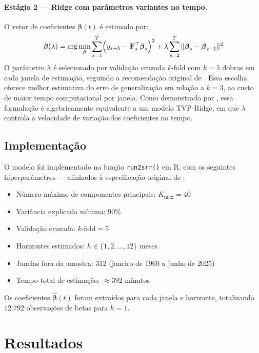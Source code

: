 \documentclass[12pt, a4paper]{article}
\begin{document}
\paragraph{Estágio 2 — Ridge com parâmetros variantes no tempo.}
O vetor de coeficientes $\boldsymbol{\beta}(t)$ é estimado por:
\[
  \hat{\boldsymbol{\beta}}(\lambda) =
  \arg\min_{\boldsymbol{\beta}}
  \sum_{s=1}^{T}
  \Bigl(y_{s+h} - \mathbf{F}_s^\top \boldsymbol{\beta}_s\Bigr)^2
  + \lambda \sum_{s=2}^{T}
  \|\boldsymbol{\beta}_s - \boldsymbol{\beta}_{s-1}\|^2
\]
O parâmetro $\lambda$ é selecionado por validação cruzada
$k$-fold com $k = 5$ dobras em cada janela de estimação,
seguindo a recomendação original de \citet{Coulombe2025}.
Essa escolha oferece melhor estimativa do erro de generalização
em relação a $k = 3$, ao custo de maior tempo computacional
por janela. Como demonstrado por \citet{Coulombe2025}, essa
formulação é algebricamente equivalente a um modelo TVP-Ridge,
em que $\lambda$ controla a velocidade de variação dos
coeficientes no tempo.

\subsection{Implementação}

O modelo foi implementado na função \texttt{run2srr()} em R,
com os seguintes hiperparâmetros — alinhados à especificação
original de \citet{Coulombe2025}:

\begin{itemize}
  \item Número máximo de componentes principais: $K_{\max} = 40$
  \item Variância explicada mínima: $90\%$
  \item Validação cruzada: $k\text{-fold} = 5$
  \item Horizontes estimados: $h \in \{1, 2, \ldots, 12\}$ meses
  \item Janelas fora da amostra: 312
    (janeiro de 1960 a junho de 2025)
  \item Tempo total de estimação: $\approx 392$ minutos
\end{itemize}

Os coeficientes $\hat{\boldsymbol{\beta}}(t)$ foram extraídos
para cada janela e horizonte, totalizando $12.792$ observações
de betas para $h = 1$.

\section{Resultados}
\label{sec:resultados}
\end{document}

